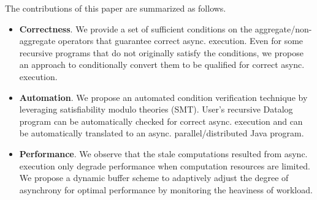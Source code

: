 The contributions of this paper are summarized as follows.
\begin{itemize}
	\item \textbf{Correctness}. We provide a set of sufficient conditions on the aggregate/non-aggregate operators that guarantee correct async. execution. Even for some recursive programs that do not originally satisfy the conditions, we propose an approach to conditionally convert them to be qualified for correct async. execution.
	\item \textbf{Automation}. We propose an automated condition verification technique by leveraging satisfiability modulo theories (SMT). User's recursive Datalog program can be automatically checked for correct async. execution and can be automatically translated to an async. parallel/distributed Java program.
	\item \textbf{Performance}. We observe that the stale computations resulted from async. execution only degrade performance when computation resources are limited. We propose a dynamic buffer scheme to adaptively adjust the degree of asynchrony for optimal performance by monitoring the heaviness of workload.

\end{itemize}
